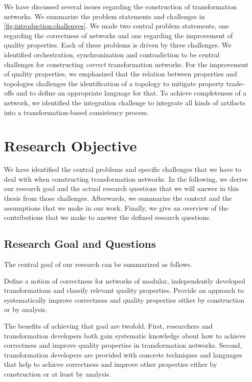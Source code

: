 We have discussed several issues regarding the construction of transformation networks.
We summarize the problem statements and challenges in \autoref{fig:introduction:challenges}.
We made two central problem statements, one regarding the correctness of networks and one regarding the improvement of quality properties.
Each of these problems is driven by three challenges.
We identified orchestration, synchronization and contradiction to be central challenges for constructing \emph{correct} transformation networks.
For the improvement of quality properties, we emphasized that the relation between properties and topologies challenges the identification of a topology to mitigate property trade-offs and to define an appropriate language for that.
To achieve completeness of a network, we identified the integration challenge to integrate all kinds of artifacts into a transformation-based consistency process.



\section{Research Objective}

We have identified the central problems and specific challenges that we have to deal with when constructing transformation networks.
In the following, we derive our research goal and the actual research questions that we will answer in this thesis from those challenges.
Afterwards, we summarize the context and the assumptions that we make in our work.
Finally, we give an overview of the contributions that we make to answer the defined research questions.

\subsection{Research Goal and Questions}

The central goal of our research can be summarized as follows.
\begin{researchgoal}
Define a notion of correctness for networks of modular, independently developed transformations and classify relevant quality properties.
Provide an approach to systematically improve correctness and quality properties either by construction or by analysis.
\end{researchgoal}

The benefits of achieving that goal are twofold.
First, researchers and transformation developers both gain systematic knowledge about how to achieve correctness and improve quality properties in transformation networks.
Second, transformation developers are provided with concrete techniques and languages that help to achieve correctness and improve other properties either by construction or at least by analysis.


